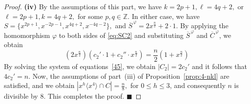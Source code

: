 \documentclass[12pt]{article}
\begin{document}
\begin{proof}
\textbf{(iv)}
 By the assumptions of this part, we have
$
k=2p+1, \ell=4q+2,
$
or
$
\ell=2p+1, k=4q+2,
$
for some \(p,q\in\mathbb{Z}\). In either case, we have
$
S=\{x^{2p+1},x^{-2p-1},x^{4q+2},x^{-4q-2}\},
$
and
$
\overline{S}^{\,\varphi}=2x^{\frac{n}{2}}+2 \cdot 1.
$ By applying the homomorphism $\varphi$ to both sides of \eqref{eq:SC2} and substituting $\overline{S}^{\,\varphi}$ and $\overline{C}^{\,\varphi}$, we obtain
\begin{equation}\label{45}
	\left(2x^{\frac{n}{2}}\right)
	\left(c_2' \cdot 1+c_2''  \cdot x^{\frac{n}{2}}\right)
	=
	\frac{n}{2}\left(1+x^{\frac{n}{2}}\right)
\end{equation}
By solving the system of equations~\eqref{45}, we obtain $
|C_2|=2c_2'
$
and it follows that $
4c_2'=n.
$ Now, the assumptions of part~(iii) of Proposition~\ref{prop:4-nkl} are satisfied, and we obtain $
\left|x^{h}\langle x^{4}\rangle\cap C\right|
=\frac{n}{8},
$ for \(0\le h\le 3\), and consequently \(n\) is divisible by \(8\). This completes the proof.
\hfill$\blacksquare$
  		\end{proof}	
  		
\end{document}
